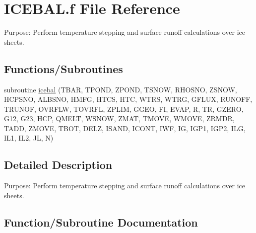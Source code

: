 \hypertarget{ICEBAL_8f}{}\section{I\+C\+E\+B\+A\+L.\+f File Reference}
\label{ICEBAL_8f}


Purpose\+: Perform temperature stepping and surface runoff calculations over ice sheets.  


\subsection*{Functions/\+Subroutines}
\begin{DoxyCompactItemize}
\item 
subroutine \hyperlink{ICEBAL_8f_abefb862d3860a7222b2eaa981efb2701}{icebal} (T\+B\+A\+R, T\+P\+O\+N\+D, Z\+P\+O\+N\+D, T\+S\+N\+O\+W, R\+H\+O\+S\+N\+O, Z\+S\+N\+O\+W, H\+C\+P\+S\+N\+O, A\+L\+B\+S\+N\+O, H\+M\+F\+G, H\+T\+C\+S, H\+T\+C, W\+T\+R\+S, W\+T\+R\+G, G\+F\+L\+U\+X, R\+U\+N\+O\+F\+F, T\+R\+U\+N\+O\+F, O\+V\+R\+F\+L\+W, T\+O\+V\+R\+F\+L, Z\+P\+L\+I\+M, G\+G\+E\+O, F\+I, E\+V\+A\+P, R, T\+R, G\+Z\+E\+R\+O, G12, G23, H\+C\+P, Q\+M\+E\+L\+T, W\+S\+N\+O\+W, Z\+M\+A\+T, T\+M\+O\+V\+E, W\+M\+O\+V\+E, Z\+R\+M\+D\+R, T\+A\+D\+D, Z\+M\+O\+V\+E, T\+B\+O\+T, D\+E\+L\+Z, I\+S\+A\+N\+D, I\+C\+O\+N\+T, I\+W\+F, I\+G, I\+G\+P1, I\+G\+P2, I\+L\+G, I\+L1, I\+L2, J\+L, N)
\end{DoxyCompactItemize}


\subsection{Detailed Description}
Purpose\+: Perform temperature stepping and surface runoff calculations over ice sheets. 



\subsection{Function/\+Subroutine Documentation}
\hypertarget{ICEBAL_8f_abefb862d3860a7222b2eaa981efb2701}{}
